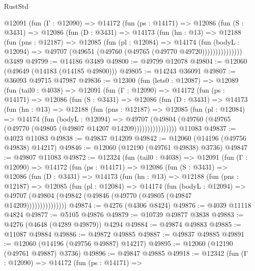 \begin{lexlean}{RustStd}
\begin{coremodule}
        @12091
          (fun (Γ : @12090) =>
          @14172
            (fun (ps : @14171) =>
            @12086
              (fun (S : @3431) =>
              @12086
                (fun (D : @3431) =>
                @14173
                  (fun (hn : @13) =>
                  @12188
                    (fun (pns : @12187) =>
                    @12085
                      (fun (pl : @12084) =>
                      @14174
                        (fun (bodyL : @12094) =>
                        @49707 (@49651 (@49760 (@49765 (@49770 @49720)))))))))))))))
    @3489
@49799 := @14186 @3489
@49800 := @49799 @12078
@49804 := @12060 (@49649 (@14183 (@14185 @49800)))
@49805 := @14243 @36091
@49807 := @36093 @49715 @47987
@49836 := @12300
    (fun (lets0 : @12087) =>
    @12089
      (fun (tail0 : @4038) =>
      @12091
        (fun (Γ : @12090) =>
        @14172
          (fun (ps : @14171) =>
          @12086
            (fun (S : @3431) =>
            @12086
              (fun (D : @3431) =>
              @14173
                (fun (hn : @13) =>
                @12188
                  (fun (pns : @12187) =>
                  @12085
                    (fun (pl : @12084) =>
                    @14174
                      (fun (bodyL : @12094) =>
                      @49707
                        (@49804
                          (@49760 (@49765 (@49770 (@49805 (@49807 @14207 @14209))))))))))))))))
    @11083
@49837 := @4023 @11083
@49838 := @49837 @14209
@49842 := @12060 (@14196 (@49756 @49838) @14217)
@49846 := @12060 (@12190 (@49761 @49838) @3736)
@49847 := @49807 @11083
@49872 := @12324
    (fun (tail0 : @4038) =>
    @12091
      (fun (Γ : @12090) =>
      @14172
        (fun (ps : @14171) =>
        @12086
          (fun (S : @3431) =>
          @12086
            (fun (D : @3431) =>
            @14173
              (fun (hn : @13) =>
              @12188
                (fun (pns : @12187) =>
                @12085
                  (fun (pl : @12084) =>
                  @14174
                    (fun (bodyL : @12094) =>
                    @49707 (@49804 (@49842 (@49846 (@49770 (@49805 (@49847 @14209)))))))))))))))
@49874 := @4276 (@4306 @8424)
@49876 := @4039 @11118 @4824
@49877 := @5105 @49876
@49879 := @10739 @49877 @3838
@49883 := @4276 (@4648 (@4289 @49879)) @4294
@49884 := @49874 @49883
@49885 := @11087 @49884
@49886 := @49872 @49885
@49887 := @49837 @49885
@49891 := @12060 (@14196 (@49756 @49887) @14217)
@49895 := @12060 (@12190 (@49761 @49887) @3736)
@49896 := @49847 @49885
@49918 := @12342
    (fun (Γ : @12090) =>
    @14172
      (fun (ps : @14171) =>

\end{coremodule}
\end{lexlean}
